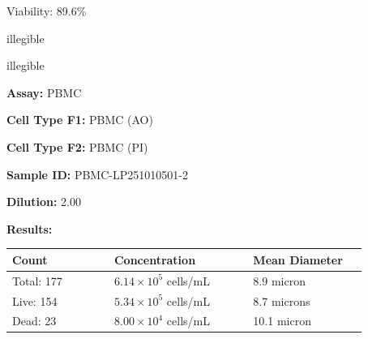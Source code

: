 \documentclass[UTF8,10pt,a4paper,fontset=fandol]{ctexart}
\newcommand{\fieldvalue}[1]{#1}
\newcommand{\handwritten}[1]{#1}
\begin{document}
Viability: %
\fieldvalue{89.6\%}

\bigskip

\handwritten{illegible}

\hspace{1.5cm}%
\handwritten{illegible}

\newpage

\noindent
\textbf{Assay:}
\fieldvalue{PBMC}

\medskip
\noindent
\textbf{Cell Type F1:}
\fieldvalue{PBMC (AO)}

\medskip
\noindent
\textbf{Cell Type F2:}
\fieldvalue{PBMC (PI)}

\medskip
\noindent
\textbf{Sample ID:}
\fieldvalue{PBMC-LP251010501-2}

\medskip
\noindent
\textbf{Dilution:}
\fieldvalue{2.00}

\bigskip
\noindent
\textbf{Results:}

\medskip
\noindent
\begin{tabular}{@{}p{0.25\linewidth}p{0.34\linewidth}p{0.28\linewidth}@{}}
\textbf{Count} & \textbf{Concentration} & \textbf{Mean Diameter} \\
\hline
Total:
\fieldvalue{177}
&
\fieldvalue{$6.14\times10^{5}$ cells/mL}
&
\fieldvalue{8.9 micron}
\\[2pt]
Live:
\fieldvalue{154}
&
\fieldvalue{$5.34\times10^{5}$ cells/mL}
&
\fieldvalue{8.7 microns}
\\[2pt]
Dead:
\fieldvalue{23}
&
\fieldvalue{$8.00\times10^{4}$ cells/mL}
&
\fieldvalue{10.1 micron}
\end{tabular}
\end{document}
